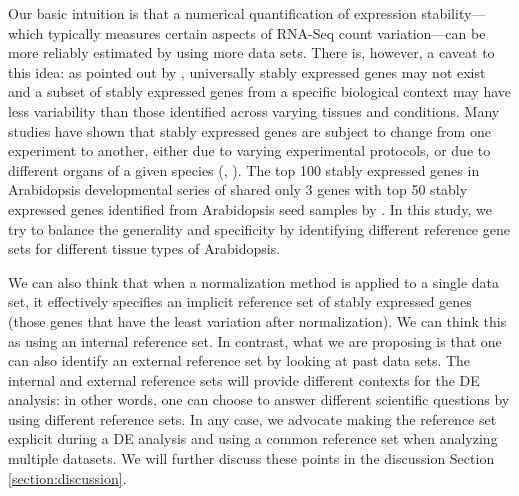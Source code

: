 \documentclass[11pt, a4paper]{article}
\begin{document}
Our basic intuition is that a numerical quantification of expression
stability---which typically measures certain aspects of RNA-Seq count
variation---can be more reliably estimated by using more data sets.  There is,
however, a caveat to this idea: as pointed out by \cite{hruz2011refgenes},
universally stably expressed genes may not exist and a subset of stably
expressed genes from a specific biological context may have less variability
than those identified across varying tissues and conditions.  Many studies
have shown that stably expressed genes are subject to change from one
experiment to another, either due to varying experimental protocols, or due to
different organs of a given species (\cite{reid2006optimized},
\cite{hong2010identification}).  The top 100 stably expressed genes in
Arabidopsis developmental series of \cite{czechowski2005genome} shared only 3
genes with top 50 stably expressed genes identified from Arabidopsis seed
samples by \cite{dekkers2012identification}.  In this study, we try to balance
the generality and specificity by identifying different reference gene sets
for different tissue types of Arabidopsis. 

We can also think that when a normalization method is applied to a single data
set, it effectively specifies an implicit reference set of stably expressed
genes (those genes that have the least variation after normalization). We can think
this as using an internal reference set. In contrast, what we are proposing is
that one can also identify an external reference set by looking at past data
sets. The internal and external reference sets will provide different contexts
for the DE analysis: in other words, one can choose to answer different
scientific questions by using different reference sets. In any case, we
advocate  making the reference set explicit during a DE analysis and using a
common reference set when analyzing multiple datasets. We will further discuss
these points in the discussion Section \ref{section:discussion}.
\end{document}

